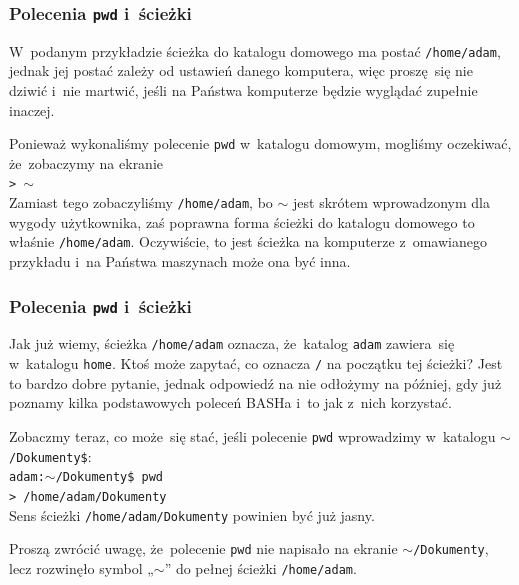 \documentclass[10pt,t]{beamer}
\begin{document}
\begin{frame}
  \frametitle{Polecenia \texttt{pwd} i~ścieżki}


  W~podanym przykładzie ścieżka do katalogu domowego ma postać
  \texttt{/home/adam}, jednak jej postać zależy od ustawień danego
  komputera, więc proszę~się nie dziwić i~nie martwić, jeśli na Państwa
  komputerze będzie wyglądać zupełnie inaczej.

  Ponieważ wykonaliśmy polecenie \texttt{pwd} w~katalogu domowym, mogliśmy
  oczekiwać, że~zobaczymy na ekranie \\
  \texttt{> $\sim$} \\
  Zamiast tego zobaczyliśmy \texttt{/home/adam}, bo $\sim$ jest skrótem
  wprowadzonym dla wygody użytkownika, zaś poprawna forma ścieżki do
  katalogu domowego to właśnie \texttt{/home/adam}. Oczywiście, to jest
  ścieżka na komputerze z~omawianego przykładu i~na Państwa maszynach może
  ona być inna.

\end{frame}





\begin{frame}
  \frametitle{Polecenia \texttt{pwd} i~ścieżki}


  Jak już wiemy, ścieżka \texttt{/home/adam} oznacza, że~katalog
  \texttt{adam} zawiera~się w~katalogu \texttt{home}. Ktoś może zapytać,
  co oznacza \texttt{/} na początku tej ścieżki? Jest to bardzo dobre
  pytanie, jednak odpowiedź na nie odłożymy na później, gdy już poznamy
  kilka podstawowych poleceń BASHa i~to jak z~nich korzystać.

  Zobaczmy teraz, co może~się stać, jeśli polecenie \texttt{pwd} wprowadzimy
  w~katalogu \texttt{$\sim$/Dokumenty\$}: \\
  \texttt{adam:$\sim$/Dokumenty\$ pwd} \\
  \texttt{> /home/adam/Dokumenty} \\
  Sens ścieżki \texttt{/home/adam/Dokumenty} powinien być już jasny.

  Proszą zwrócić uwagę, że~polecenie \texttt{pwd} nie napisało na ekranie
  \texttt{$\sim$/Dokumenty}, lecz rozwinęło symbol „$\sim$” do pełnej
  ścieżki \texttt{/home/adam}.

\end{frame}
\end{document}
